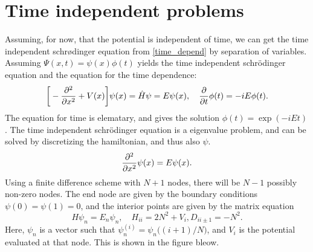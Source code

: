 \documentclass{article}
\begin{document}
\section*{Time independent problems}
    Assuming, for now, that the potential is independent of time, we can get the time independent schrødinger equation from \eqref{time_depend} by separation of variables. Assuming $\Psi(x, t) = \psi(x)\phi(t)$  yields the time independent schrödinger equation and the equation for the time dependence:
    \begin{equation}
        \bigg[-\pdv[2]{x} + V(x) \bigg] \psi(x) = \hat H \psi = E \psi(x), \quad \pdv{t}\phi(t) = -iE\phi(t).
    \end{equation}
    The equation for time is elematary, and gives the solution $\phi(t) = \exp(-iEt)$. The time independent schrödinger equation is a eigenvalue problem, and can be solved by discretizing the hamiltonian, and thus also $\psi$. 
    \begin{equation*}
        \pdv[2]{x}\psi(x) = E \psi(x).
    \end{equation*}
    Using a finite difference scheme with $N + 1$ nodes, there will be $N-1$ possibly non-zero nodes. The end node are given by the boundary conditions $\psi(0) = \psi(1) = 0$, and the interior points are given by the matrix equation
    \begin{equation*}
        H \psi_n = E_n \psi_n, \quad H_{ii} = 2N^2 + V_i, D_{ii\pm1} = -N^2.
    \end{equation*}
    Here, $\psi_n$ is a vector such that $\psi_n^{(i)} = \psi_n\big((i+1)/N\big)$, and $V_i$ is the potential evaluated at that node. This is shown in the figure bleow.

    \begin{center}
    \end{center}
\end{document}
